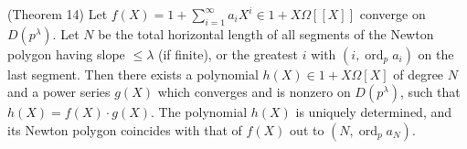 (Theorem 14) Let $f(X) = 1 + \sum_{i=1}^\infty a_i X^i \in 1 + X\Omega[[X]]$ converge on $D(p^\lambda)$. Let $N$ be the total horizontal length of all segments of the Newton polygon having slope $\leq \lambda$ (if finite), or the greatest $i$ with $(i,\operatorname{ord}_p a_i)$ on the last segment. Then there exists a polynomial $h(X) \in 1 + X\Omega[X]$ of degree $N$ and a power series $g(X)$ which converges and is nonzero on $D(p^\lambda)$, such that $h(X) = f(X) \cdot g(X)$. The polynomial $h(X)$ is uniquely determined, and its Newton polygon coincides with that of $f(X)$ out to $(N,\operatorname{ord}_p a_N)$.